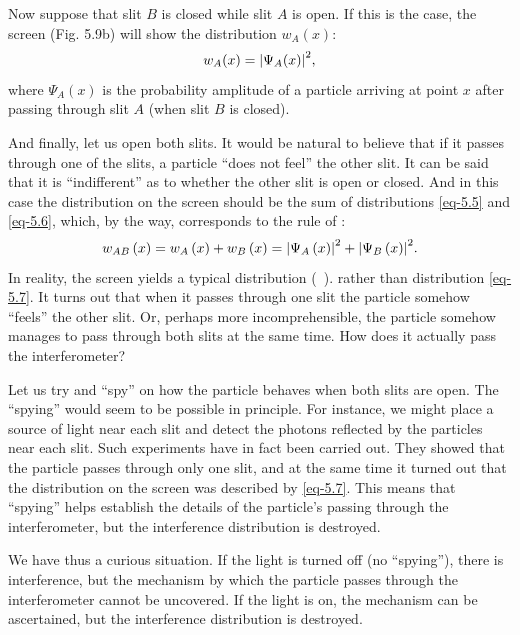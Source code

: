 Now suppose that slit $B$ is closed while slit $A$ is open. If this is the case, the screen (Fig. 5.9b) will show the distribution $w_{A} (x)$:
\begin{equation}%
w_{A} (x) = \abs{\Psi_{A}  (x)}^{2},
\label{eq-5.6}
\end{equation}
where $\Psi_{A}(x)$ is the probability amplitude of a particle arriving at point
$x$ after passing through slit $A$ (when slit $B$ is closed).

And finally, let us open both slits. It would be natural to believe that
if it passes through one of the slits, a particle ``does not feel'' the other
slit. It can be said that it is ``indifferent'' as to whether the other slit is
open or closed. And in this case the distribution on the screen should be
the sum of distributions \eqref{eq-5.5} and \eqref{eq-5.6}, which, by the way, corresponds to the rule of : 
\begin{equation}%
w_{AB} \, (x) = w_{A} \, (x) + w_{B} \, (x) =  \abs{\Psi_{A} \, (x)}^{2} +  \abs{\Psi_{B} \, (x)}^{2}.
\label{eq-5.7}
\end{equation}
In reality, the screen yields a typical  distribution
 (~).  rather than distribution \eqref{eq-5.7}. It turns out that when it passes through one slit the particle somehow ``feels'' the other slit. Or, perhaps more incomprehensible, the particle somehow manages to pass through both slits at the same time. How does it actually pass the
interferometer?

 Let us try and ``spy'' on
how the particle behaves when both slits are open. The ``spying'' would
seem to be possible in principle. For instance, we might place a source
of light near each slit and detect the photons reflected by the particles
near each slit. Such experiments have in fact been carried out. They
showed that the particle passes through only one slit, and at the same
time it turned out that the distribution on the screen was described by
\eqref{eq-5.7}. This means that ``spying'' helps establish the details of the particle's passing through the interferometer, but the interference distribution is destroyed.

We have thus a curious situation. If the light is turned off (no
``spying''), there is interference, but the mechanism by which the particle
passes through the interferometer cannot be uncovered. If the light is on,
the mechanism can be ascertained, but the interference distribution is destroyed.


